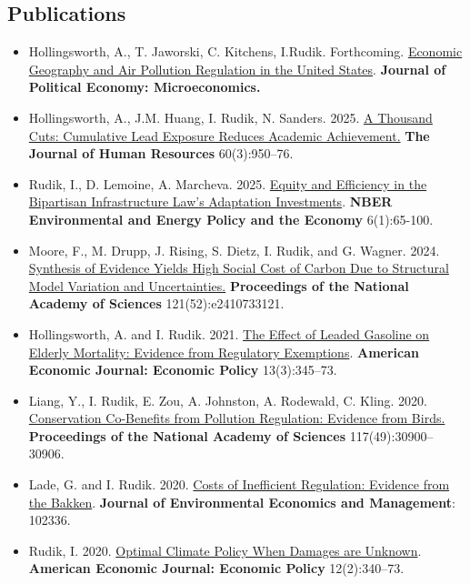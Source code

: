 \documentclass[11pt]{res} %
\begin{document}
\begin{resume}
\subsection{Publications}
\begin{itemize}
	\item[] Hollingsworth, A., T. Jaworski, C. Kitchens, I.Rudik. Forthcoming. \href{https://osf.io/preprints/socarxiv/x6fuw/}{Economic Geography and Air Pollution Regulation in the United States}. \textbf{Journal of Political Economy: Microeconomics.}
	\item[] Hollingsworth, A., J.M. Huang, I. Rudik, N. Sanders. 2025. \href{https://www.nber.org/papers/w28250}{A Thousand Cuts: Cumulative Lead Exposure Reduces Academic Achievement.} \textbf{The Journal of Human Resources} 60(3):950--76.
	\item[] Rudik, I., D. Lemoine, A. Marcheva. 2025. \href{https://www.nber.org/books-and-chapters/environmental-and-energy-policy-and-economy-volume-6/equity-and-efficiency-bipartisan-infrastructure-laws-adaptation-investments}{Equity and Efficiency in the Bipartisan Infrastructure Law’s Adaptation Investments}. \textbf{NBER Environmental and Energy Policy and the Economy} 6(1):65-100.
	\item[] Moore, F., M. Drupp, J. Rising, S. Dietz, I. Rudik, and G. Wagner. 2024. \href{https://www.pnas.org/doi/10.1073/pnas.2410733121}{Synthesis of Evidence Yields High Social Cost of Carbon Due to Structural Model Variation and Uncertainties.} \textbf{Proceedings of the National Academy of Sciences} 121(52):e2410733121.
	\item[] Hollingsworth, A. and I. Rudik. 2021. \href{https://osf.io/preprints/socarxiv/rdy6g}{The Effect of Leaded Gasoline on Elderly Mortality: Evidence from Regulatory Exemptions}. \textbf{American Economic Journal: Economic Policy} 13(3):345--73.
	\item[] Liang, Y., I. Rudik, E. Zou, A. Johnston, A. Rodewald, C. Kling. 2020. \href{https://www.pnas.org/content/early/2020/11/23/2013568117}{Conservation Co-Benefits from Pollution Regulation: Evidence from Birds.} \textbf{Proceedings of the National Academy of Sciences} 117(49):30900--30906.
	\item[] Lade, G. and I. Rudik. 2020. \href{https://papers.ssrn.com/sol3/papers.cfm?abstract_id=3086728}{Costs of Inefficient Regulation: Evidence from the Bakken}. \textbf{Journal of Environmental Economics and Management}: 102336.
	\item[] Rudik, I. 2020. \href{https://www.aeaweb.org/articles?id=10.1257/pol.20160541}{Optimal Climate Policy When Damages are Unknown}. \textbf{American Economic Journal: Economic Policy} 12(2):340--73.

\end{itemize}
\end{resume}
\end{document}
